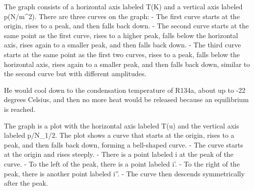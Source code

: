 The graph consists of a horizontal axis labeled T(K) and a vertical axis labeled p(N/m^2). There are three curves on the graph:
- The first curve starts at the origin, rises to a peak, and then falls back down.
- The second curve starts at the same point as the first curve, rises to a higher peak, falls below the horizontal axis, rises again to a smaller peak, and then falls back down.
- The third curve starts at the same point as the first two curves, rises to a peak, falls below the horizontal axis, rises again to a smaller peak, and then falls back down, similar to the second curve but with different amplitudes.

He would cool down to the condensation temperature of R134a, about up to -22 degrees Celsius, and then no more heat would be released because an equilibrium is reached.

The graph is a plot with the horizontal axis labeled T(u) and the vertical axis labeled p/N_1/2. The plot shows a curve that starts at the origin, rises to a peak, and then falls back down, forming a bell-shaped curve.
- The curve starts at the origin and rises steeply.
- There is a point labeled i at the peak of the curve.
- To the left of the peak, there is a point labeled i'.
- To the right of the peak, there is another point labeled i''.
- The curve then descends symmetrically after the peak.
